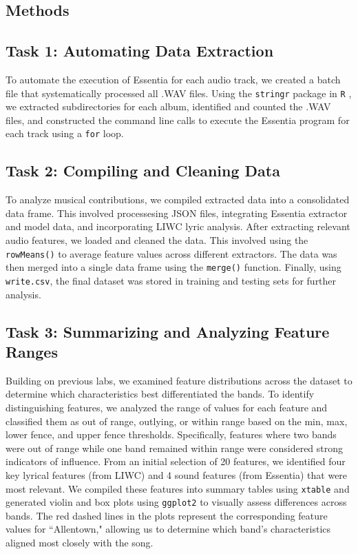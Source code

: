 \documentclass{article}\usepackage[]{graphicx}\usepackage[]{xcolor}
\begin{document}
\begin{multicols}{2}
\section{Methods}

\subsection{Task 1: Automating Data Extraction}
To automate the execution of Essentia for each audio track, we created a batch file that systematically processed all .WAV files. Using the \texttt{stringr} package in \texttt{R} \citep{stringr}, we extracted subdirectories for each album, identified and counted the .WAV files, and constructed the command line calls to execute the Essentia program for each track using a \texttt{for} loop. 

\columnbreak

\subsection{Task 2: Compiling and Cleaning Data}
To analyze musical contributions, we compiled extracted data into a consolidated data frame. This involved processesing JSON files, integrating Essentia extractor and model data, and incorporating LIWC lyric analysis. After extracting relevant audio features, we loaded and cleaned the data. This involved using the \texttt{rowMeans()} to average feature values across different extractors. The data was then merged into a single data frame using the \texttt{merge()} function. Finally, using \texttt{write.csv}, the final dataset was stored in training and testing sets for further analysis.

\subsection{Task 3: Summarizing and Analyzing Feature Ranges}
Building on previous labs, we examined feature distributions across the dataset to determine which characteristics best differentiated the bands. To identify distinguishing features, we analyzed the range of values for each feature and classified them as out of range, outlying, or within range based on the min, max, lower fence, and upper fence thresholds. Specifically, features where two bands were out of range while one band remained within range were considered strong indicators of influence. From an initial selection of 20 features, we identified four key lyrical features (from LIWC) and 4 sound features (from Essentia) that were most relevant. We compiled these features into summary tables using  \texttt{xtable} and generated violin and box plots using \texttt{ggplot2} to visually assess differences across bands. The red dashed lines in the plots represent the corresponding feature values for ``Allentown," allowing us to determine which band's characteristics aligned most closely with the song.


\end{multicols}
\end{document}
